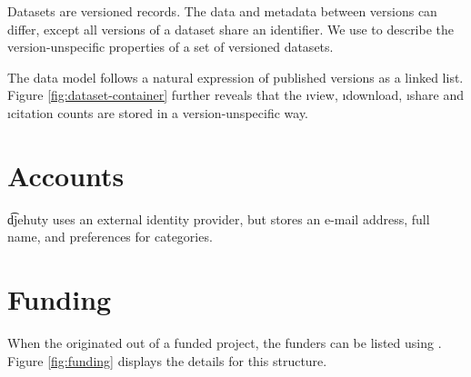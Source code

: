 
  Datasets are versioned records.  The data and metadata between versions
  can differ, except all versions of a dataset share an identifier.  We use
   to describe the version-unspecific properties
  of a set of versioned datasets.


  The data model follows a natural expression of published versions as a
  linked list.  Figure \ref{fig:dataset-container} further reveals that
  the \i{view}, \i{download}, \i{share} and \i{citation} counts are stored
  in a version-unspecific way.

\section{Accounts}

  \t{djehuty} uses an external identity provider, but stores an e-mail address,
  full name, and preferences for categories.


\section{Funding}

  When the  originated out of a funded project, the funders
  can be listed using .  Figure \ref{fig:funding} displays
  the details for this structure.


